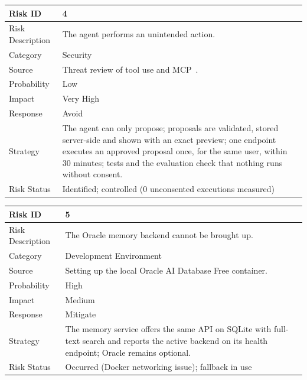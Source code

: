 \documentclass[oneside,a4paper,12pt]{report}
\begin{document}
\begin{table}[!htbp]
\begin{center}
\def\arraystretch{1.5}
\begin{tabularx}{\textwidth}{| l | X |}
\hline
Risk ID	& 4 \\ \hline
Risk Description	& The agent performs an unintended action. \\ \hline
Category	& Security \\ \hline
Source	& Threat review of tool use and MCP~\cite{hou2025mcp}. \\ \hline
Probability	& Low \\ \hline
Impact	& Very High \\ \hline
Response	& Avoid \\ \hline
Strategy	& The agent can only propose; proposals are validated, stored server-side and shown with an exact preview; one endpoint executes an approved proposal once, for the same user, within 30 minutes; tests and the evaluation check that nothing runs without consent. \\ \hline
Risk Status	& Identified; controlled (0 unconsented executions measured) \\ \hline
\end{tabularx}
\end{center}
\label{tab:risk4}
\end{table}

\begin{table}[!htbp]
\begin{center}
\def\arraystretch{1.5}
\begin{tabularx}{\textwidth}{| l | X |}
\hline
Risk ID	& 5 \\ \hline
Risk Description	& The Oracle memory backend cannot be brought up. \\ \hline
Category	& Development Environment \\ \hline
Source	& Setting up the local Oracle AI Database Free container. \\ \hline
Probability	& High \\ \hline
Impact	& Medium \\ \hline
Response	& Mitigate \\ \hline
Strategy	& The memory service offers the same API on SQLite with full-text search and reports the active backend on its health endpoint; Oracle remains optional. \\ \hline
Risk Status	& Occurred (Docker networking issue); fallback in use \\ \hline
\end{tabularx}
\end{center}
\label{tab:risk5}
\end{table}
\end{document}
